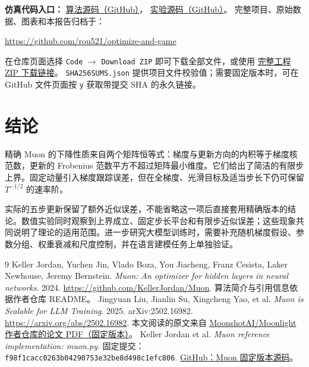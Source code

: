 \documentclass[11pt,a4paper]{article}
\theoremstyle{definition}
\begin{document}
\noindent\textbf{仿真代码入口：}
\href{https://github.com/rou521/optimize-and-game/blob/main/muon_study/optimizers.py}{算法源码（GitHub）}，
\href{https://github.com/rou521/optimize-and-game/blob/main/muon_study/experiments.py}{实验源码（GitHub）}。
完整项目、原始数据、图表和本报告归档于：
\begin{center}\url{https://github.com/rou521/optimize-and-game}\end{center}
在仓库页面选择 \texttt{Code} $\to$ \texttt{Download ZIP} 即可下载全部文件，或使用
\href{https://github.com/rou521/optimize-and-game/archive/refs/heads/main.zip}{完整工程 ZIP 下载链接}。
\texttt{SHA256SUMS.json} 提供项目文件校验值；需要固定版本时，可在 GitHub 文件页面按 \texttt{y} 获取带提交 SHA 的永久链接。

\section{结论}
精确 Muon 的下降性质来自两个矩阵恒等式：梯度与更新方向的内积等于梯度核范数，更新的 Frobenius 范数平方不超过矩阵最小维度。它们给出了简洁的有限步上界。固定动量引入梯度跟踪误差，但在全梯度、光滑目标及适当步长下仍可保留 $T^{-1/2}$ 的速率阶。

实际的五步更新保留了额外近似误差，不能省略这一项后直接套用精确版本的结论。数值实验同时观察到上界成立、固定步长平台和有限步近似误差；这些现象共同说明了理论的适用范围。进一步研究大模型训练时，需要补充随机梯度假设、参数分组、权重衰减和尺度控制，并在语言建模任务上单独验证。

\begin{thebibliography}{9}
 Keller Jordan, Yuchen Jin, Vlado Boza, You Jiacheng, Franz Cesista, Laker Newhouse, Jeremy Bernstein.
\emph{Muon: An optimizer for hidden layers in neural networks}. 2024.
\url{https://github.com/KellerJordan/Muon}.
算法简介与引用信息依据作者仓库 README。
 Jingyuan Liu, Jianlin Su, Xingcheng Yao, et al.
\emph{Muon is Scalable for LLM Training}. 2025. arXiv:2502.16982.
\url{https://arxiv.org/abs/2502.16982}.
本文阅读的原文来自
\href{https://github.com/MoonshotAI/Moonlight/blob/c2ad5b20c605086526a179d36901bfc41b52b44b/Moonlight.pdf}{MoonshotAI/Moonlight 作者仓库的论文 PDF（固定版本）}。
 Keller Jordan et al. \emph{Muon reference implementation: muon.py}.
固定提交：\texttt{f98f1cacc0263b04290753e32be8d498c1efc806}.
\href{https://github.com/KellerJordan/Muon/blob/f98f1cacc0263b04290753e32be8d498c1efc806/muon.py}{GitHub：Muon 固定版本源码}。
\end{thebibliography}
\end{document}
